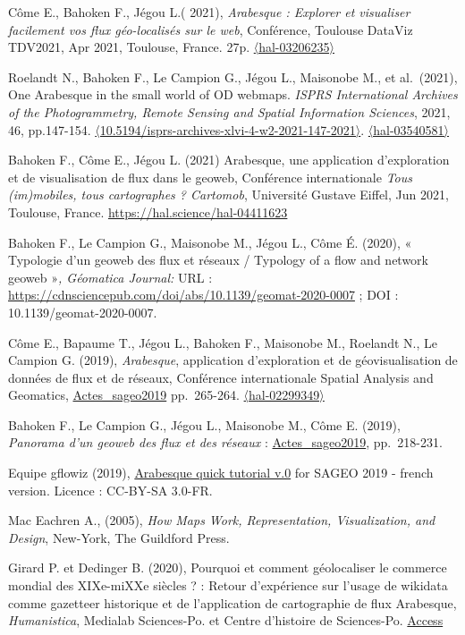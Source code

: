 \documentclass[
  letterpaper,
  DIV=11,
  numbers=noendperiod]{scrreprt}
\newlength{\cslhangindent}
\newenvironment{CSLReferences}[2] %
 {\begin{list}{}{%
  \setlength{\itemindent}{0pt}
  \setlength{\leftmargin}{0pt}
  \setlength{\parsep}{0pt}
  \ifodd #1
   \setlength{\leftmargin}{\cslhangindent}
   \setlength{\itemindent}{-1\cslhangindent}
  \fi
  \setlength{\itemsep}{#2\baselineskip}}}
 {\end{list}}
\begin{document}
Côme E., Bahoken F., Jégou L.( 2021), \emph{Arabesque : Explorer et
visualiser facilement vos flux géo-localisés sur le web}, Conférence,
Toulouse DataViz TDV2021, Apr 2021, Toulouse, France. 27p.
\href{https://hal.science/hal-03206235}{〈hal-03206235〉}

Roelandt N., Bahoken F., Le Campion G., Jégou L., Maisonobe M., et
al.~(2021), One Arabesque in the small world of OD webmaps. \emph{ISPRS
International Archives of the Photogrammetry, Remote Sensing and Spatial
Information Sciences}, 2021, 46, pp.147-154.
\href{https://dx.doi.org/10.5194/isprs-archives-xlvi-4-w2-2021-147-2021}{〈10.5194/isprs-archives-xlvi-4-w2-2021-147-2021〉}.
\href{https://hal.science/hal-03540581}{〈hal-03540581〉}

Bahoken F., Côme E., Jégou L. (2021) Arabesque, une application
d'exploration et de visualisation de flux dans le geoweb, Conférence
internationale \emph{Tous (im)mobiles, tous cartographes ? Cartomob},
Université Gustave Eiffel, Jun 2021, Toulouse, France.
\url{https://hal.science/hal-04411623}

Bahoken F., Le Campion G., Maisonobe M., Jégou L., Côme É. (2020), «
Typologie d'un geoweb des flux et réseaux / Typology of a flow and
network geoweb »\emph{, Géomatica Journal:} URL :
\url{https://cdnsciencepub.com/doi/abs/10.1139/geomat-2020-0007} ; DOI :
10.1139/geomat-2020-0007.

Côme E., Bapaume T., Jégou L., Bahoken F., Maisonobe M., Roelandt N., Le
Campion G. (2019), \emph{Arabesque}, application d'exploration et de
géovisualisation de données de flux et de réseaux, Conférence
internationale Spatial Analysis and Geomatics,
\href{https://sageo2019.irstea.fr/actes/}{Actes\_sageo2019} pp.~265-264.
\href{https://hal.science/hal-02299349}{〈hal-02299349〉}

Bahoken F., Le Campion G., Jégou L., Maisonobe M., Côme E. (2019),
\emph{Panorama d'un geoweb des flux et des réseaux} :
\href{https://sageo2019.irstea.fr/actes/}{Actes\_sageo2019},
pp.~218-231.

Equipe gflowiz (2019),
\href{https://github.com/gflowiz/sageo-ricardo}{Arabesque quick tutorial
v.0} for SAGEO 2019 - french version. Licence : CC-BY-SA 3.0-FR.

Mac Eachren A., (2005), \emph{How Maps Work, Representation,
Visualization, and Design}, New-York, The Guildford Press.

Girard P. et Dedinger B. (2020), Pourquoi et comment géolocaliser le
commerce mondial des XIXe-miXXe siècles ? : Retour d'expérience sur
l'usage de wikidata comme gazetteer historique et de l'application de
cartographie de flux Arabesque, \emph{Humanistica}, Medialab
Sciences-Po. et Centre d'histoire de Sciences-Po.
\href{http://medialab.github.io/publications/geolocaliserRICardo@humanistica2020/}{Access}

\label{refs}
\begin{CSLReferences}{0}{1}
\end{CSLReferences}
\end{document}
